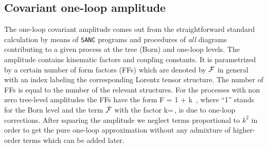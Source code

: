 \documentclass[%
 reprint,
amsmath,
amssymb,
 aps,
 prb,
 floatfix,
]{revtex4-1}
\begin{document}
\subsection{Covariant one-loop amplitude}

The one-loop covariant amplitude comes out from
the straightforward standard calculation
by means of {\tt SANC} programs 
and procedures of {\em all} diagrams contributing 
to a given process at the tree (Born) and one-loop levels.
The amplitude contains kinematic factors and coupling constants. 
It is parametrized by a certain number 
of form factors (FFs) which are denoted by ${\cal F}$
in general with an index labeling the corresponding Lorentz tensor structure.
The number of FFs is equal to the number of the relevant structures. 
For the processes with non zero tree-level amplitudes the FFs have the form
\bqa
{\cal F} = 1 + k {}\,,
\eqa 
where ``1'' stands for the Born level and the term ${\tilde{\cal F}}$ with the factor
\bqa
k=\,,
\label{kaen}
\eqa 
is due to one-loop corrections.
After squaring the amplitude we neglect terms proportional to $k^2$ in order
to get the pure one-loop approximation without any admixture of higher-order
terms which can be added later.
\end{document}
